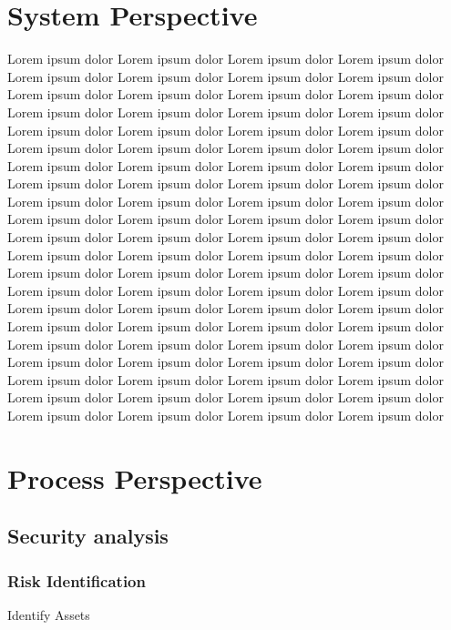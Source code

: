 \documentclass{article}
\begin{document}


\tableofcontents
\newpage

\section{System Perspective}
Lorem ipsum dolor Lorem ipsum dolor Lorem ipsum dolor Lorem ipsum dolor Lorem ipsum dolor Lorem ipsum dolor Lorem ipsum dolor Lorem ipsum dolor Lorem ipsum dolor Lorem ipsum dolor Lorem ipsum dolor Lorem ipsum dolor Lorem ipsum dolor Lorem ipsum dolor Lorem ipsum dolor Lorem ipsum dolor Lorem ipsum dolor Lorem ipsum dolor Lorem ipsum dolor Lorem ipsum dolor Lorem ipsum dolor Lorem ipsum dolor Lorem ipsum dolor Lorem ipsum dolor Lorem ipsum dolor Lorem ipsum dolor Lorem ipsum dolor Lorem ipsum dolor Lorem ipsum dolor Lorem ipsum dolor Lorem ipsum dolor Lorem ipsum dolor Lorem ipsum dolor Lorem ipsum dolor Lorem ipsum dolor Lorem ipsum dolor Lorem ipsum dolor Lorem ipsum dolor Lorem ipsum dolor Lorem ipsum dolor Lorem ipsum dolor Lorem ipsum dolor Lorem ipsum dolor Lorem ipsum dolor Lorem ipsum dolor Lorem ipsum dolor Lorem ipsum dolor Lorem ipsum dolor Lorem ipsum dolor Lorem ipsum dolor Lorem ipsum dolor Lorem ipsum dolor Lorem ipsum dolor Lorem ipsum dolor Lorem ipsum dolor Lorem ipsum dolor Lorem ipsum dolor Lorem ipsum dolor Lorem ipsum dolor Lorem ipsum dolor Lorem ipsum dolor Lorem ipsum dolor Lorem ipsum dolor Lorem ipsum dolor Lorem ipsum dolor Lorem ipsum dolor Lorem ipsum dolor Lorem ipsum dolor Lorem ipsum dolor Lorem ipsum dolor Lorem ipsum dolor Lorem ipsum dolor Lorem ipsum dolor Lorem ipsum dolor Lorem ipsum dolor Lorem ipsum dolor Lorem ipsum dolor Lorem ipsum dolor Lorem ipsum dolor Lorem ipsum dolor Lorem ipsum dolor Lorem ipsum dolor Lorem ipsum dolor Lorem ipsum dolor 

\section{Process Perspective}

\subsection{\Large Security analysis}
\subsubsection{\Large Risk Identification}

{\large Identify Assets}
\end{document}
